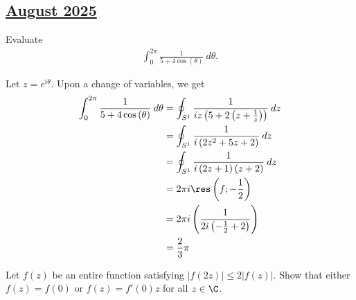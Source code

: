 \documentclass[10pt]{mypackage}
\begin{document}
\subsection{\href{https://math.virginia.edu/graduate/exams/analysis/2025Aug_complex.html}{August 2025}}%
\begin{problem}[Problem 1]
  Evaluate
  \begin{align*}
    \int_{0}^{2\pi} \frac{1}{5 + 4\cos\left( \theta \right)}\:d\theta.
  \end{align*}
\end{problem}
\begin{solution}
  Let $z = e^{i\theta}$. Upon a change of variables, we get
  \begin{align*}
    \int_{0}^{2\pi} \frac{1}{5 + 4\cos\left( \theta \right)}\:d\theta &= \oint_{S^1}^{} \frac{1}{iz\left( 5 + 2\left( z + \frac{1}{z} \right) \right)}\:dz\\
                                                                      &= \oint_{S^1}^{} \frac{1}{i\left( 2z^2 + 5z + 2 \right)}\:dz\\
                                                                      &= \oint_{S^{1}}^{} \frac{1}{i\left( 2z + 1 \right)\left( z+2 \right)}\:dz\\
                                                                      &= 2\pi i \res\left( f;-\frac{1}{2} \right)\\
                                                                      &= 2\pi i \left( \frac{1}{2i\left( -\frac{1}{2} + 2 \right)} \right)\\
                                                                      &= \frac{2}{3}\pi
  \end{align*}
\end{solution}
\begin{problem}[Problem 2]
  Let $f(z)$ be an entire function satisfying $\left\vert f\left( 2z \right) \right\vert\leq 2\left\vert f(z) \right\vert$. Show that either $f(z) = f(0)$ or $f(z) = f'(0)z$ for all $z\in \C$.
\end{problem}
\end{document}
